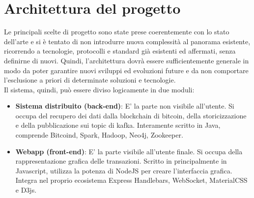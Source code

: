 \section{Architettura  del progetto}
\label{sec:architettura del progetto}
Le principali scelte di progetto sono state prese coerentemente con lo stato dell’arte e si è tentato di non introdurre nuova complessità al panorama esistente, ricorrendo a tecnologie, protocolli e standard già esistenti ed affermati, senza definirne di nuovi. Quindi, l’architettura dovrà essere sufficientemente generale in modo da poter garantire nuovi sviluppi ed evoluzioni future e da non comportare l’esclusione a priori di determinate soluzioni e tecnologie. 
\\Il sistema, quindi, può essere diviso logicamente in due moduli:
\begin{itemize}
	\item \textbf{Sistema distribuito (back-end)}: E' la parte non visibile all'utente. Si occupa del recupero dei dati dalla blockchain di bitcoin, della storicizzazione e della pubblicazione sui topic di kafka. Interamente scritto in Java, comprende Bitcoind, Spark, Hadoop, Neo4j, Zookeeper.
	\item \textbf{Webapp (front-end)}: E' la parte visibile all'utente finale. Si occupa della rappresentazione grafica delle transazioni. Scritto in principalmente in Javascript, utilizza la potenza di NodeJS per creare l'interfaccia grafica. Integra nel proprio ecosistema Express Handlebars, WebSocket, MaterialCSS e D3js.
\end{itemize} 

